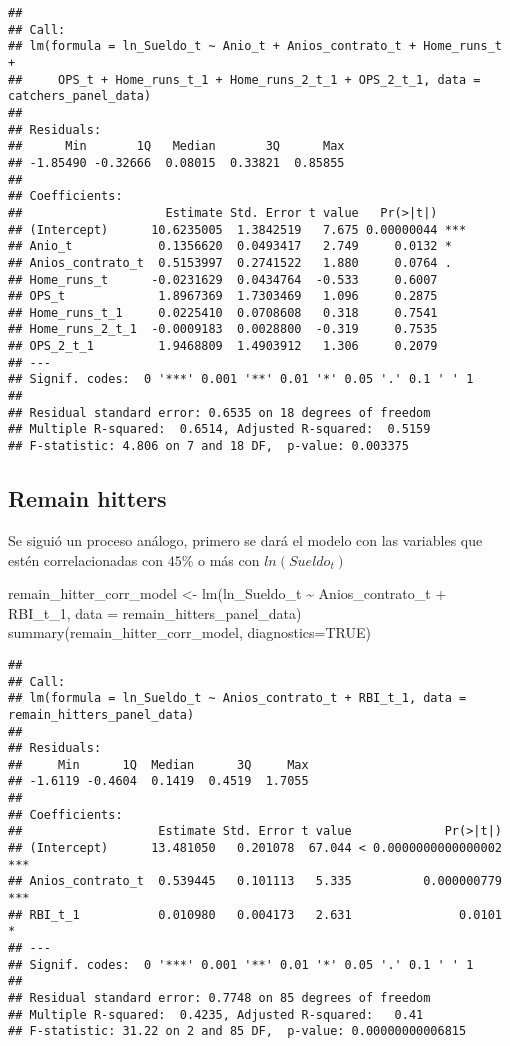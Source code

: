 \documentclass[
]{article}
\newenvironment{Shaded}{\begin{snugshade}}{\end{snugshade}}
\newcommand{\AttributeTok}[1]{\textcolor[rgb]{0.77,0.63,0.00}{#1}}
\newcommand{\ConstantTok}[1]{\textcolor[rgb]{0.00,0.00,0.00}{#1}}
\newcommand{\FunctionTok}[1]{\textcolor[rgb]{0.00,0.00,0.00}{#1}}
\newcommand{\NormalTok}[1]{#1}
\newcommand{\OtherTok}[1]{\textcolor[rgb]{0.56,0.35,0.01}{#1}}
\newcommand{\SpecialCharTok}[1]{\textcolor[rgb]{0.00,0.00,0.00}{#1}}
\begin{document}
\begin{verbatim}
## 
## Call:
## lm(formula = ln_Sueldo_t ~ Anio_t + Anios_contrato_t + Home_runs_t + 
##     OPS_t + Home_runs_t_1 + Home_runs_2_t_1 + OPS_2_t_1, data = catchers_panel_data)
## 
## Residuals:
##      Min       1Q   Median       3Q      Max 
## -1.85490 -0.32666  0.08015  0.33821  0.85855 
## 
## Coefficients:
##                    Estimate Std. Error t value   Pr(>|t|)    
## (Intercept)      10.6235005  1.3842519   7.675 0.00000044 ***
## Anio_t            0.1356620  0.0493417   2.749     0.0132 *  
## Anios_contrato_t  0.5153997  0.2741522   1.880     0.0764 .  
## Home_runs_t      -0.0231629  0.0434764  -0.533     0.6007    
## OPS_t             1.8967369  1.7303469   1.096     0.2875    
## Home_runs_t_1     0.0225410  0.0708608   0.318     0.7541    
## Home_runs_2_t_1  -0.0009183  0.0028800  -0.319     0.7535    
## OPS_2_t_1         1.9468809  1.4903912   1.306     0.2079    
## ---
## Signif. codes:  0 '***' 0.001 '**' 0.01 '*' 0.05 '.' 0.1 ' ' 1
## 
## Residual standard error: 0.6535 on 18 degrees of freedom
## Multiple R-squared:  0.6514, Adjusted R-squared:  0.5159 
## F-statistic: 4.806 on 7 and 18 DF,  p-value: 0.003375
\end{verbatim}

\subsection{Remain hitters}

Se siguió un proceso análogo, primero se dará el modelo con las
variables que estén correlacionadas con \(45\%\) o más con
\(ln(Sueldo_{t})\)

\begin{Shaded}
\begin{Highlighting}[]
\NormalTok{remain\_hitter\_corr\_model }\OtherTok{\textless{}{-}} \FunctionTok{lm}\NormalTok{(ln\_Sueldo\_t }\SpecialCharTok{\textasciitilde{}}\NormalTok{ Anios\_contrato\_t }\SpecialCharTok{+}\NormalTok{ RBI\_t\_1,}
                                      \AttributeTok{data =}\NormalTok{ remain\_hitters\_panel\_data)}
\FunctionTok{summary}\NormalTok{(remain\_hitter\_corr\_model, }\AttributeTok{diagnostics=}\ConstantTok{TRUE}\NormalTok{)}
\end{Highlighting}
\end{Shaded}

\begin{verbatim}
## 
## Call:
## lm(formula = ln_Sueldo_t ~ Anios_contrato_t + RBI_t_1, data = remain_hitters_panel_data)
## 
## Residuals:
##     Min      1Q  Median      3Q     Max 
## -1.6119 -0.4604  0.1419  0.4519  1.7055 
## 
## Coefficients:
##                   Estimate Std. Error t value             Pr(>|t|)    
## (Intercept)      13.481050   0.201078  67.044 < 0.0000000000000002 ***
## Anios_contrato_t  0.539445   0.101113   5.335          0.000000779 ***
## RBI_t_1           0.010980   0.004173   2.631               0.0101 *  
## ---
## Signif. codes:  0 '***' 0.001 '**' 0.01 '*' 0.05 '.' 0.1 ' ' 1
## 
## Residual standard error: 0.7748 on 85 degrees of freedom
## Multiple R-squared:  0.4235, Adjusted R-squared:   0.41 
## F-statistic: 31.22 on 2 and 85 DF,  p-value: 0.00000000006815
\end{verbatim}
\end{document}
